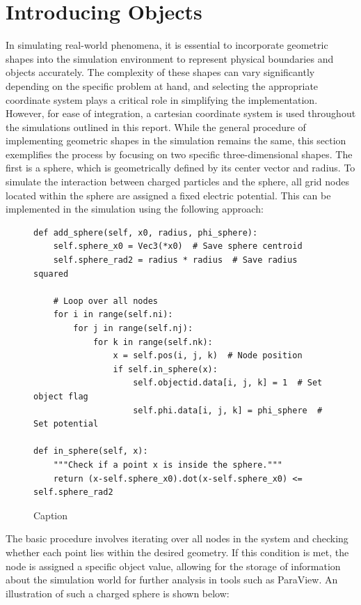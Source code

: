 \section{Introducing Objects}
\label{Sec: Introducing Objects}

In simulating real-world phenomena, it is essential to incorporate geometric shapes into the simulation environment to represent physical boundaries and objects accurately. The complexity of these shapes can vary significantly depending on the specific problem at hand, and selecting the appropriate coordinate system plays a critical role in simplifying the implementation. However, for ease of integration, a cartesian coordinate system is used throughout the simulations outlined in this report. While the general procedure of implementing geometric shapes in the simulation remains the same, this section exemplifies the process by focusing on two specific three-dimensional shapes. The first is a sphere, which is geometrically defined by its center vector and radius. To simulate the interaction between charged particles and the sphere, all grid nodes located within the sphere are assigned a fixed electric potential. This can be implemented in the simulation using the following approach:

\begin{figure}[H]
    \centering
    \begin{lstlisting}
def add_sphere(self, x0, radius, phi_sphere):
    self.sphere_x0 = Vec3(*x0)  # Save sphere centroid
    self.sphere_rad2 = radius * radius  # Save radius squared
    
    # Loop over all nodes
    for i in range(self.ni):
        for j in range(self.nj):
            for k in range(self.nk):
                x = self.pos(i, j, k)  # Node position
                if self.in_sphere(x):
                    self.objectid.data[i, j, k] = 1  # Set object flag
                    self.phi.data[i, j, k] = phi_sphere  # Set potential

def in_sphere(self, x):
    """Check if a point x is inside the sphere."""
    return (x-self.sphere_x0).dot(x-self.sphere_x0) <= self.sphere_rad2
\end{lstlisting}
    \caption{Caption}
    \label{fig:enter-label}
\end{figure}

The basic procedure involves iterating over all nodes in the system and checking whether each point lies within the desired geometry. If this condition is met, the node is assigned a specific object value, allowing for the storage of information about the simulation world for further analysis in tools such as ParaView. An illustration of such a charged sphere is shown below:

